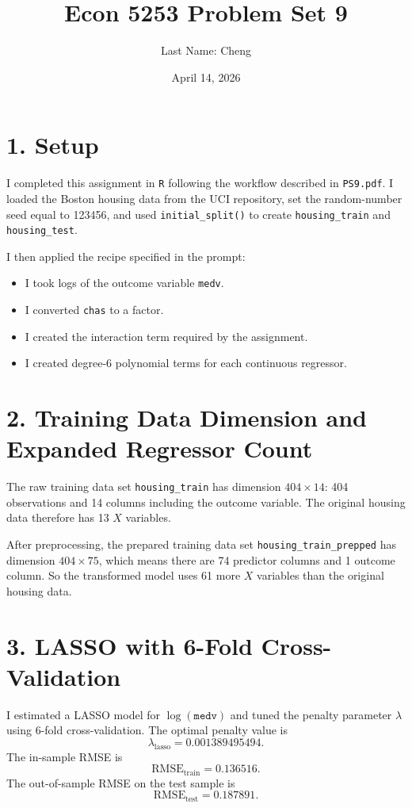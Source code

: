 \documentclass[11pt]{article}
\title{Econ 5253 Problem Set 9}
\author{Last Name: Cheng}
\date{April 14, 2026}
\begin{document}
\maketitle

\section*{1. Setup}
I completed this assignment in \texttt{R} following the workflow described in \texttt{PS9.pdf}.
I loaded the Boston housing data from the UCI repository, set the random-number seed equal to 123456, and used \texttt{initial\_split()} to create \texttt{housing\_train} and \texttt{housing\_test}.

I then applied the recipe specified in the prompt:
\begin{itemize}
\item I took logs of the outcome variable \texttt{medv}.
\item I converted \texttt{chas} to a factor.
\item I created the interaction term required by the assignment.
\item I created degree-6 polynomial terms for each continuous regressor.
\end{itemize}

\section*{2. Training Data Dimension and Expanded Regressor Count}
The raw training data set \texttt{housing\_train} has dimension \(404 \times 14\): 404 observations and 14 columns including the outcome variable.
The original housing data therefore has 13 \(X\) variables.

After preprocessing, the prepared training data set \texttt{housing\_train\_prepped} has dimension \(404 \times 75\), which means there are 74 predictor columns and 1 outcome column.
So the transformed model uses 61 more \(X\) variables than the original housing data.

\section*{3. LASSO with 6-Fold Cross-Validation}
I estimated a LASSO model for \(\log(\texttt{medv})\) and tuned the penalty parameter \(\lambda\) using 6-fold cross-validation.
The optimal penalty value is
\[
\lambda_{\text{lasso}} = 0.001389495494.
\]
The in-sample RMSE is
\[
\text{RMSE}_{\text{train}} = 0.136516.
\]
The out-of-sample RMSE on the test sample is
\[
\text{RMSE}_{\text{test}} = 0.187891.
\]
\end{document}
